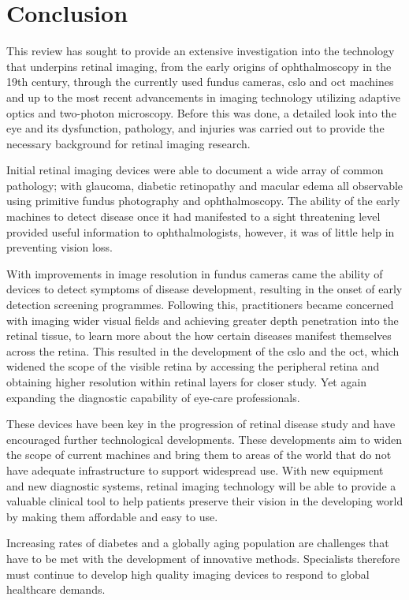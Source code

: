 \chapter{Conclusion}

\label{conclusion}

This review has sought to provide an extensive investigation
into the technology that underpins retinal imaging, from the
early origins of ophthalmoscopy in the 19th century, through the 
currently used fundus cameras, \Gls{cslo} and \Gls{oct} machines and up 
to the most recent advancements in imaging technology utilizing 
adaptive optics and two-photon microscopy. Before this was done, 
a detailed look into the eye and its dysfunction, pathology, and 
injuries was carried out to provide the necessary background for 
retinal imaging research.

Initial retinal imaging devices were able to document a wide array 
of common pathology; with glaucoma, diabetic retinopathy and macular 
edema all observable using primitive fundus photography and 
ophthalmoscopy. The ability of the early machines to detect 
disease once it had manifested to a sight threatening level provided 
useful information to ophthalmologists, however, it was of little help 
in preventing vision loss. 

With improvements in image resolution in fundus cameras came 
the ability of devices to detect symptoms of disease development, 
resulting in the onset of early detection screening programmes. 
Following this, practitioners became concerned with imaging 
wider visual fields and achieving greater depth penetration into 
the retinal tissue, to learn more about the how certain diseases 
manifest themselves across the retina. This resulted in the 
development of the \Gls{cslo} and the \Gls{oct}, which widened the scope 
of the visible retina by accessing the peripheral retina and obtaining 
higher resolution within retinal layers for closer study. Yet again 
expanding the diagnostic capability of eye-care professionals. 

These devices have been key in the progression of retinal disease 
study and have encouraged further technological developments. 
These developments aim to widen the scope of current machines 
and bring them to areas of the world that do not have adequate 
infrastructure to support widespread use. With new equipment and 
new diagnostic systems, retinal imaging technology will be able to 
provide a valuable clinical tool to help patients preserve their vision 
in the developing world by making them affordable and easy to use.
 
Increasing rates of diabetes and a globally aging population are 
challenges that have to be met with the development of innovative 
methods. Specialists therefore must continue to develop high 
quality imaging devices to respond to global healthcare demands. 

